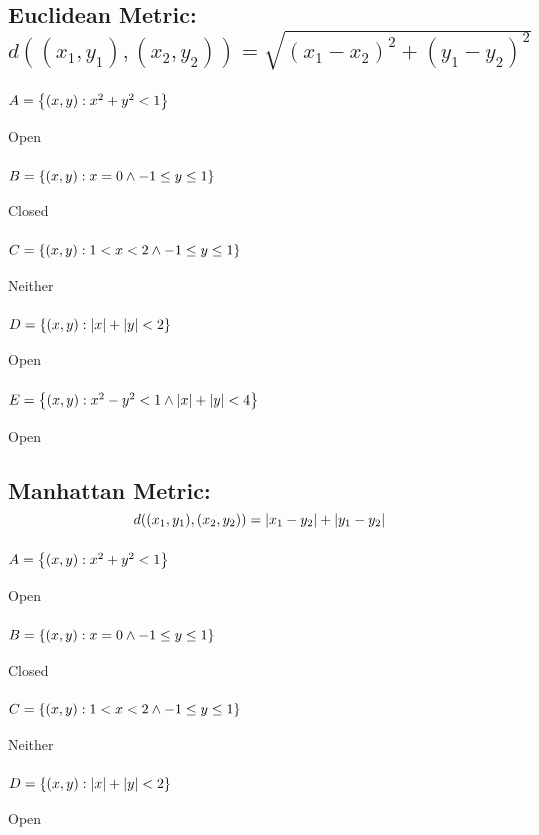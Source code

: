 \documentclass[]{article}
\begin{document}
\subsection{Euclidean Metric: 
$d((x_1,y_1),(x_2,y_2)) = \sqrt{(x_1-x_2)^2 + (y_1-y_2)^2}$%
}
\subsubsection{$A = \qty{(x,y) : x^2 + y^2 < 1}$}
Open
\subsubsection{$B = \qty{(x,y) : x = 0 \land -1 \leq y \leq 1}$}
Closed
\subsubsection{$C = \qty{(x,y) : 1 < x < 2 \land -1 \leq y \leq 1}$}
Neither
\subsubsection{$D = \qty{(x,y) : \abs{x} + \abs{y} < 2}$}
Open
\subsubsection{$E = \qty{(x,y) : x^2 - y^2 < 1 \land \abs{x} + \abs{y} < 4}$}
Open

\subsection{Manhattan Metric: 
$$d((x_1,y_1),(x_2,y_2)) = \abs{x_1-y_2} + \abs{y_1-y_2}$$%
}
\subsubsection{$A = \qty{(x,y) : x^2 + y^2 < 1}$}
Open
\subsubsection{$B = \qty{(x,y) : x = 0 \land -1 \leq y \leq 1}$}
Closed
\subsubsection{$C = \qty{(x,y) : 1 < x < 2 \land -1 \leq y \leq 1}$}
Neither
\subsubsection{$D = \qty{(x,y) : \abs{x} + \abs{y} < 2}$}
Open
\end{document}
